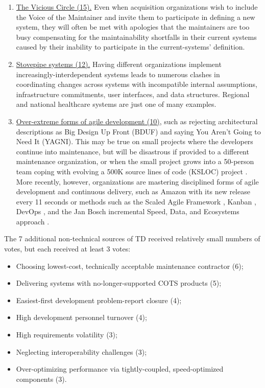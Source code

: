 \begin{enumerate}
	\item \ul{The Vicious Circle (15).}
	Even when acquisition organizations wish to include the Voice of the Maintainer and invite them to participate in defining a new system, they will often be met with apologies that the maintainers are too busy compensating for the maintainability shortfalls in their current systems caused by their inability to participate in the current-systems' definition.
	\item \ul{Stovepipe systems (12).}
	Having different organizations implement increasingly-interdependent systems leads to numerous clashes in coordinating changes across systems with incompatible internal assumptions, infrastructure commitments, user interfaces, and data structures.
	Regional and national healthcare systems are just one of many examples.
	\item \ul{ Over-extreme forms of agile development (10)}, such as rejecting architectural descriptions as Big Design Up Front (BDUF) and saying You Aren't Going to Need It (YAGNI).
	This may be true on small projects where the developers continue into maintenance, but will be disastrous if provided to a different maintenance organization, or when the small project grows into a 50-person team coping with evolving a 500K source lines of code (KSLOC) project \citep{1008006}.
	More recently, however, organizations are mastering disciplined forms of agile development and continuous delivery, such as Amazon with its new release every 11 seconds or methods such as the Scaled Agile Framework \citep{leffingwell2007scaling}, Kanban \citep{anderson2010kanban}, DevOps \citep{davis2016effective}, and the Jan Bosch incremental Speed, Data, and Ecosystems approach \citep{bosch2017speed}.
\end{enumerate}

The 7 additional non-technical sources of TD received relatively small numbers of votes, but each received at least 3 votes:
\begin{itemize}
	\item Choosing lowest-cost, technically acceptable maintenance contractor (6);
	\item Delivering systems with no-longer-supported COTS products (5);
	\item Easiest-first development problem-report closure (4);
	\item High development personnel turnover (4);
	\item High requirements volatility (3);
	\item Neglecting interoperability challenges (3);
	\item Over-optimizing performance via tightly-coupled, speed-optimized components (3).
\end{itemize}


